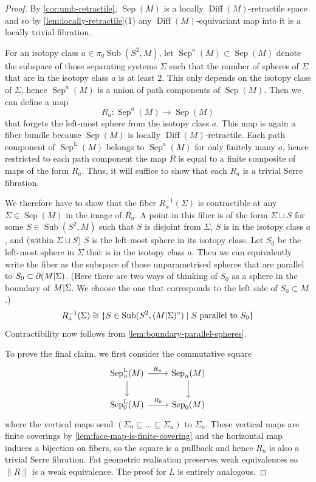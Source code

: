 \documentclass{amsart}
\theoremstyle{plain}
\theoremstyle{definition}
\DeclareMathOperator\Diff{Diff}
\DeclareMathOperator{\umb}{Sub} %
\DeclareMathOperator\sep{Sep} %
\newcommand{\sepL}{\sep^{\mathrm{L}}} %
\newcommand{\ca}{\smash{\mid}} %
\begin{document}
\begin{proof}
    By \cref{cor:umb-retractile}, $\sep(M)$ is a locally $\Diff(M)$-retractile space and so by \cref{lem:locally-retractile}(1) any $\Diff(M)$-equivariant map into it is a locally trivial fibration.

    For an isotopy class $a \in \pi_0\umb(S^2, M)$, let $\sep^a(M) \subset \sep(M)$ denote the subspace of those separating systems $\Sigma$ such that the number of spheres of $\Sigma$ that are in the isotopy class $a$ is at least $2$. This only depends on the isotopy class of $\Sigma$, hence $\sep^a(M)$ is a union of path components of $\sep(M)$.
    Then we can define a map
    \[
        R_a\colon \sep^a(M) \to \sep(M) 
    \]
    that forgets the left-most sphere from the isotopy class $a$. 
    This map is again a fiber bundle because $\sep(M)$ is locally $\Diff(M)$-retractile. Each path component of $\sepL(M)$ belongs to $\sep^a(M)$ for only finitely many $a$, hence restricted to each path component the map $R$ is equal to a finite composite of maps of the form $R_a$. Thus, it will suffice to show that each $R_a$ is a trivial Serre fibration.



    We therefore have to show that the fiber $R_a^{-1}(\Sigma)$ is contractible at any $\Sigma \in \sep(M)$ in the image of $R_a$.
    A point in this fiber is of the form $\Sigma \sqcup S$ for some $S \in \umb(S^2, M)$ such that $S$ is disjoint from $\Sigma$, $S$ is in the isotopy class $a$, and (within $\Sigma \sqcup S$) $S$ is the left-most sphere in its isotopy class.
    Let $S_0$ be the left-most sphere in $\Sigma$ that is in the isotopy class $a$.
    Then we can equivalently write the fiber as the subspace  of those unparametrised spheres that are parallel to $S_0 \subset \partial (M\ca \Sigma)$.
    (Here there are two ways of thinking of $S_0$ as a sphere in the boundary of $M\ca \Sigma$. We choose the one that corresponds to the left side of $S_0 \subset M$.)
    \[
        R_a^{-1}(\Sigma) \cong 
        \{S \in \umb(S^2, (M \ca \Sigma)^\circ) \;|\; S \text{ parallel to } S_0\}
    \]
    Contractibility now follows from \cref{lem:boundary-parallel-spheres}.

    To prove the final claim, we first consider the commutative square
    \[\begin{tikzcd}
        \sepL_n(M) \ar[r, "R_n"] \ar[d] & \sep_n(M) \ar[d] \\
        \sepL_0(M) \ar[r, "R_0"] & \sep_0(M)
    \end{tikzcd}\]
    where the vertical maps send $(\Sigma_0 \subseteq \dots \subseteq \Sigma_n)$ to $\Sigma_n$.
    These vertical maps are finite coverings by \cref{lem:face-map-is-finite-covering} and the horizontal map induces a bijection on fibers, so the square is a pullback and hence $R_n$ is also a trivial Serre fibration. 
    Fat geometric realisation preserves weak equivalences \cite[Theorem 2.2]{EbertRandalWilliams} so $\|R\|$ is a weak equivalence.
    The proof for $L$ is entirely analogous.
\end{proof}
\end{document}
